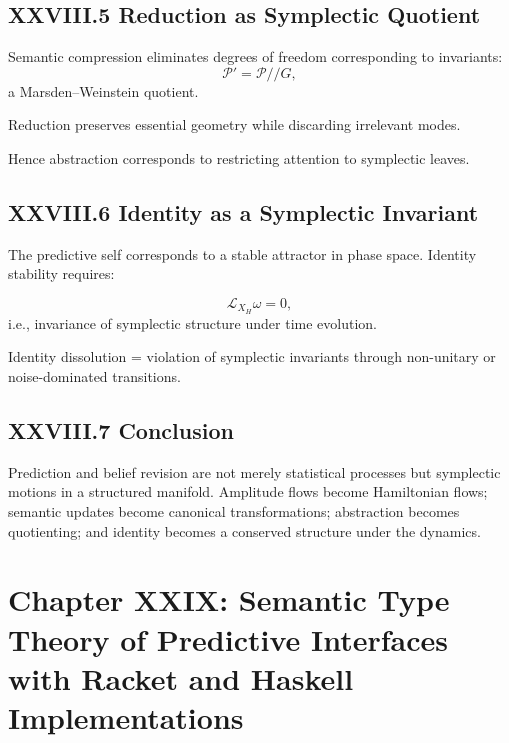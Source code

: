 \documentclass[12pt,letterpaper]{article}
\begin{document}
\subsection{XXVIII.5 Reduction as Symplectic Quotient}

Semantic compression eliminates degrees of freedom corresponding to invariants:
\[
\mathcal{P}' = \mathcal{P} /\!/ G,
\]
a Marsden–Weinstein quotient.

Reduction preserves essential geometry while discarding irrelevant modes.

Hence abstraction corresponds to restricting attention to symplectic leaves.

\subsection{XXVIII.6 Identity as a Symplectic Invariant}

The predictive self corresponds to a stable attractor in phase space.  
Identity stability requires:

\[
\mathcal{L}_{X_H}\omega = 0,
\]
i.e., invariance of symplectic structure under time evolution.

Identity dissolution = violation of symplectic invariants through non-unitary or noise-dominated transitions.

\subsection{XXVIII.7 Conclusion}

Prediction and belief revision are not merely statistical processes but symplectic motions in a structured manifold. Amplitude flows become Hamiltonian flows; semantic updates become canonical transformations; abstraction becomes quotienting; and identity becomes a conserved structure under the dynamics.

\newpage

\section{Chapter XXIX: Semantic Type Theory of Predictive Interfaces  
with Racket and Haskell Implementations}
\end{document}
